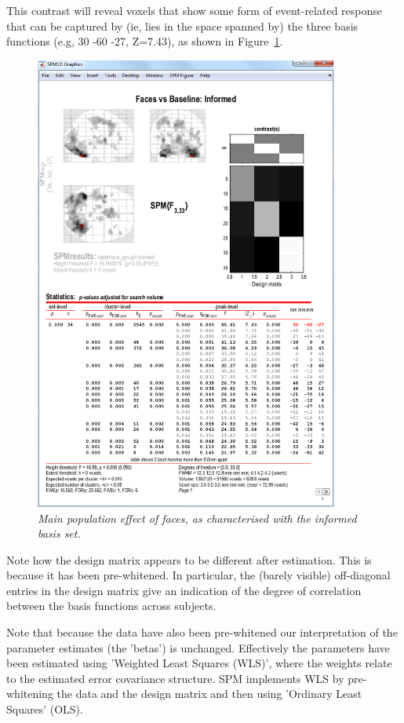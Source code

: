 This contrast will reveal voxels that show some form of event-related response that can be captured by (ie, lies in the space spanned by) the three basis functions (e.g, 30 -60 -27, Z=7.43), as shown in Figure~\ref{informed_results}. 
\begin{figure}
\begin{center}
\includegraphics[width=100mm]{faces_group/informed_results}
\caption{\em Main population effect of faces, as characterised with the informed basis set. \label{informed_results}}
\end{center}
\end{figure}

Note how the design matrix appears to be different after estimation. This is because it has been pre-whitened. In particular, the (barely visible) off-diagonal entries in the design matrix give an indication of the degree of correlation between the basis functions across subjects.

Note that because the data have also been pre-whitened our interpretation of the parameter estimates (the 'betas') is unchanged. Effectively the parameters have been estimated using 'Weighted Least Squares (WLS)', where the weights relate to the estimated error covariance structure. SPM implements WLS by pre-whitening the data and the design matrix and then using 'Ordinary Least Squares' (OLS).

